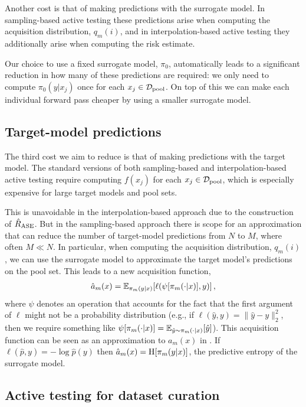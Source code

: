 Another cost is that of making predictions with the surrogate model.
In sampling-based active testing these predictions arise when computing the acquisition distribution, $q_m(i)$, and in interpolation-based active testing they additionally arise when computing the risk estimate.

Our choice to use a fixed surrogate model, $\pi_0$, automatically leads to a significant reduction in how many of these predictions are required: we only need to compute $\pi_0(y|x_j)$ once for each $x_j \in \mathcal{D}_\mathrm{pool}$.
On top of this we can make each individual forward pass cheaper by using a smaller surrogate model.


\subsection{Target-model predictions}\label{sec:target_prediction}

The third cost we aim to reduce is that of making predictions with the target model.
The standard versions of both sampling-based and interpolation-based active testing require computing $f(x_j)$ for each $x_j \in \mathcal{D}_\mathrm{pool}$, which is especially expensive for large target models and pool sets.

This is unavoidable in the interpolation-based approach due to the construction of $\hat{R}_\mathrm{ASE}$.
But in the sampling-based approach there is scope for an approximation that can reduce the number of target-model predictions from $N$ to $M$, where often $M \ll N$.
In particular, when computing the acquisition distribution, $q_m(i)$, we can use the surrogate model to approximate the target model's predictions on the pool set.
This leads to a new acquisition function,
\begin{align*}
    \hat{a}_m(x) = \mathbb{E}_{\pi_m(y|x)} \! \left[ \ell(\psi[\pi_m(\cdot|x)], y) \right]
    ,
\end{align*}
where $\psi$ denotes an operation that accounts for the fact that the first argument of $\ell$ might not be a probability distribution (e.g., if $\ell(\hat{y}, y) = \|\hat{y}-y\|_2^2$, then we require something like $\psi[\pi_m(\cdot|x)] = \mathbb{E}_{\hat{y}
\sim\pi_m(\cdot|x)} \! \left[ \hat{y} \right]$).
This acquisition function can be seen as an approximation to $a_m(x)$ in .
If $\ell(\hat{p}, y) = -\log \hat{p}(y)$ then $\hat{a}_m(x) = \mathrm{H} \! \left[ \pi_m(y|x) \right]$, the predictive entropy of the surrogate model.


\subsection{Active testing for dataset curation}\label{sec:dataset_curation_method}

